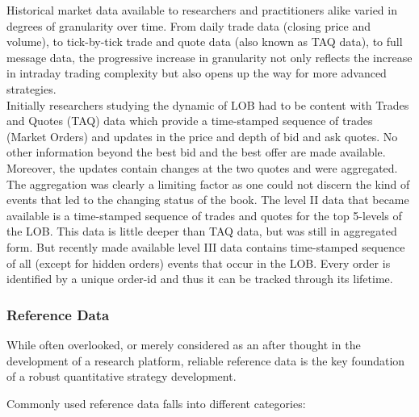Historical market data available to researchers and practitioners alike varied in degrees of granularity over time. From daily trade data (closing price and volume), to tick-by-tick trade and quote data (also known as TAQ data), to full message data, the progressive increase in granularity not only reflects the increase in intraday trading complexity but also opens up the way for more advanced strategies. \\

Initially researchers studying the dynamic of LOB had to be content with Trades and Quotes (TAQ) data which provide a time-stamped sequence of trades (Market Orders) and updates in the price and depth of bid and ask quotes. No other information beyond the best bid and the best offer are made available. Moreover, the updates contain changes at the two quotes and were aggregated. The aggregation was clearly a limiting factor as one could not discern the kind of events that led to the changing status of the book. The level II data that became available is a time-stamped sequence of trades and quotes for the top 5-levels of the LOB. This data is little deeper than TAQ data, but was still in aggregated form. But recently made available level III data contains time-stamped sequence of all (except for hidden orders) events that occur in the LOB. Every order is identified by a unique order-id and thus it can be tracked through its lifetime. \\



\subsubsection{Reference Data}

While often overlooked, or merely considered as an after thought in the development of a research platform, reliable reference data is the key foundation of a robust quantitative strategy development.

Commonly used reference data falls into different categories:

